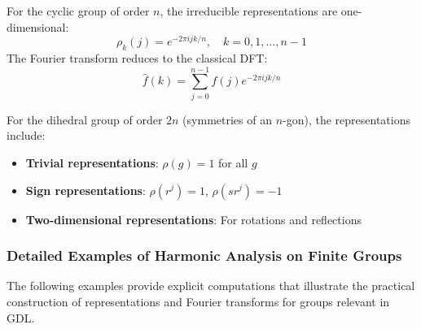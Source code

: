 \begin{example}\label{ex:grupo_ciclico_fourier}
For the cyclic group of order $n$, the irreducible representations are one-dimensional:
\begin{equation}
\rho_k(j) = e^{-2\pi i jk/n}, \quad k = 0, 1, \ldots, n-1
\end{equation}
The Fourier transform reduces to the classical DFT:
\begin{equation}
\hat{f}(k) = \sum_{j=0}^{n-1} f(j) e^{-2\pi i jk/n}
\end{equation}
\end{example}

\begin{example}\label{ex:grupo_diedrico_fourier}
For the dihedral group of order $2n$ (symmetries of an $n$-gon), the representations include:
\begin{itemize}
    \item \textbf{Trivial representations}: $\rho(g) = 1$ for all $g$
    \item \textbf{Sign representations}: $\rho(r^j) = 1$, $\rho(sr^j) = -1$
    \item \textbf{Two-dimensional representations}: For rotations and reflections
\end{itemize}
\end{example}

\subsubsection{Detailed Examples of Harmonic Analysis on Finite Groups}

The following examples provide explicit computations that illustrate the practical construction of representations and Fourier transforms for groups relevant in GDL.

